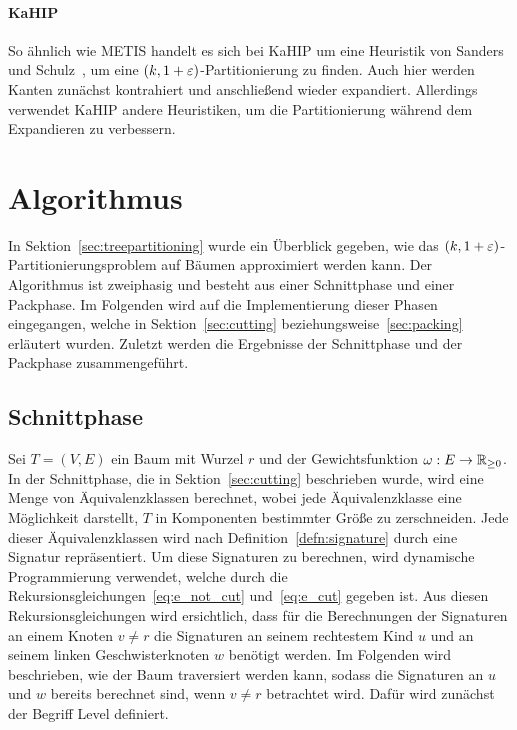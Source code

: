 \paragraph{KaHIP}
So ähnlich wie METIS handelt es sich bei KaHIP um eine Heuristik von Sanders und Schulz~\cite{SS13}, um eine $(k, 1 + \varepsilon)$\hyp Partitionierung zu finden.
Auch hier werden Kanten zunächst kontrahiert und anschließend wieder expandiert.
Allerdings verwendet KaHIP andere Heuristiken, um die Partitionierung während dem Expandieren zu verbessern.

\section{Algorithmus}\label{sec:algimpl}
In Sektion~\ref{sec:treepartitioning} wurde ein Überblick gegeben, wie das $(k,1+\varepsilon)$\hyp Partitionierungsproblem auf Bäumen approximiert werden kann. 
Der Algorithmus ist zweiphasig und besteht aus einer Schnittphase und einer Packphase.
Im Folgenden wird auf die Implementierung dieser Phasen eingegangen, welche in Sektion~\ref{sec:cutting} beziehungsweise~\ref{sec:packing} erläutert wurden.
Zuletzt werden die Ergebnisse der Schnittphase und der Packphase zusammengeführt.

\subsection{Schnittphase}\label{sec:cuttingimpl}
Sei $T=(V,E)$ ein Baum mit Wurzel $r$ und der Gewichtsfunktion $\omega : E \rightarrow \mathbb{R}_{\geq 0}$.
In der Schnittphase, die in Sektion~\ref{sec:cutting} beschrieben wurde, wird eine Menge von Äquivalenzklassen berechnet, wobei jede Äquivalenzklasse eine Möglichkeit darstellt, $T$ in Komponenten bestimmter Größe zu zerschneiden.
Jede dieser Äquivalenzklassen wird nach Definition~\ref{defn:signature} durch eine Signatur repräsentiert.
Um diese Signaturen zu berechnen, wird dynamische Programmierung verwendet, welche durch die Rekursionsgleichungen~\eqref{eq:e_not_cut} und~\eqref{eq:e_cut} gegeben ist.
Aus diesen Rekursionsgleichungen wird ersichtlich, dass für die Berechnungen der Signaturen an einem Knoten $v \neq r$ die Signaturen an seinem rechtestem Kind $u$ und an seinem linken Geschwisterknoten $w$ benötigt werden.
Im Folgenden wird beschrieben, wie der Baum traversiert werden kann, sodass die Signaturen an $u$ und $w$ bereits berechnet sind, wenn $v \neq r$ betrachtet wird. 
Dafür wird zunächst der Begriff Level definiert.

